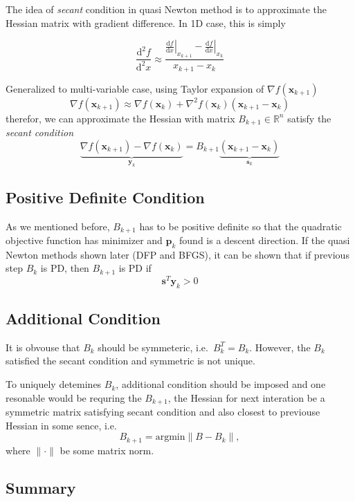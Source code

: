\documentclass[
  letterpaper,
  DIV=11,
  numbers=noendperiod]{scrreprt}
\theoremstyle{definition}
\theoremstyle{plain}
\theoremstyle{plain}
\theoremstyle{definition}
\theoremstyle{plain}
\theoremstyle{plain}
\theoremstyle{remark}
\begin{document}
The idea of \emph{secant} condition in quasi Newton method is to
approximate the Hessian matrix with gradient difference. In 1D case,
this is simply

\[
\frac{\mathrm{d}^2f}{\mathrm{d}^2x}\approx\frac{\left.\frac{\mathrm{d}f}{\mathrm{d}x}\right|_{x_{k+1}} - \left.\frac{\mathrm{d}f}{\mathrm{d}x}\right|_{x_k}}{x_{k+1}-x_k}
\]

Generalized to multi-variable case, using Taylor expansion of
\(\nabla f(\mathbf{x}_{k+1})\) \[
\nabla f(\mathbf{x}_{k+1}) \approx \nabla f(\mathbf{x}_k) + \nabla ^2 f(\mathbf{x}_k)(\mathbf{x}_{k+1} - \mathbf{x}_k)
\] therefor, we can approximate the Hessian with matrix
\(B_{k+1}\in\mathbb{R}^n\) satisfy the \emph{secant condition} \[
\underbrace{\nabla f(\mathbf{x}_{k+1}) - \nabla f(\mathbf{x}_k)}_{\mathbf{y}_k} = B_{k+1}\underbrace{(\mathbf{x}_{k+1}-\mathbf{x}_k)}_{\mathbf{s}_k} 
\]

\subsection{Positive Definite
Condition}\label{positive-definite-condition}

As we mentioned before, \(B_{k+1}\) has to be positive definite so that
the quadratic objective function has minimizer and \(\mathbf{p}_k\)
found is a descent direction. If the quasi Newton methods shown later
(DFP and BFGS), it can be shown that if previous step \(B_{k}\) is PD,
then \(B_{k+1}\) is PD if \[
\mathbf{s}^T\mathbf{y}_k>0
\]

\subsection{Additional Condition}\label{additional-condition}

It is obvouse that \(B_k\) should be symmeteric, i.e.~\(B^T_k = B_k\).
However, the \(B_k\) satisfied the secant condition and symmetric is not
unique.

To uniquely detemines \(B_k\), additional condition should be imposed
and one resonable would be requring the \(B_{k+1}\), the Hessian for
next interation be a symmetric matrix satisfying secant condition and
also closest to previouse Hessian in some sence, i.e. \[
B_{k+1} = \mathrm{argmin}\lVert B - B_k \rVert, 
\] where \(\lVert\cdot\rVert\) be some matrix norm.

\subsection{Summary}\label{summary}
\end{document}
